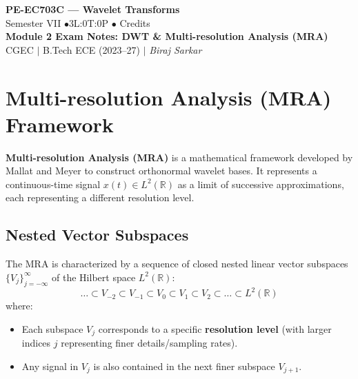\documentclass[12pt,a4paper]{article}
\begin{document}

\begin{center}
  {\LARGE\bfseries\color{myred} PE-EC703C --- Wavelet Transforms}\\[5pt]
  {\normalsize\color{mydark} Semester VII \quad$\bullet$\quad 3L:0T:0P \quad$\bullet$ Credits}\\[3pt]
  {\normalsize\color{myteal}\textbf{Module 2 Exam Notes: DWT \& Multi-resolution Analysis (MRA)}}\\[3pt]
  {\small\color{mydark} CGEC \;$|$\; B.Tech ECE (2023--27) \;$|$\; \textit{Biraj Sarkar}}
\end{center}
\vspace{2pt}
\noindent{\color{myred}\rule{\linewidth}{1.5pt}}
\vspace{2pt}

\hypersetup{linkcolor=mydark}
\tableofcontents
\hypersetup{linkcolor=myteal}
\newpage

\section{Multi-resolution Analysis (MRA) Framework}

\begin{tcolorbox}[defbox, title={\textbf{Definition of Multi-resolution Analysis}}]
\textbf{Multi-resolution Analysis (MRA)} is a mathematical framework developed by Mallat and Meyer to construct orthonormal wavelet bases. It represents a continuous-time signal $x(t) \in L^2(\mathbb{R})$ as a limit of successive approximations, each representing a different resolution level.
\end{tcolorbox}

\subsection{Nested Vector Subspaces}
The MRA is characterized by a sequence of closed nested linear vector subspaces $\{V_j\}_{j=-\infty}^{\infty}$ of the Hilbert space $L^2(\mathbb{R})$:
$$\dots \subset V_{-2} \subset V_{-1} \subset V_0 \subset V_1 \subset V_2 \subset \dots \subset L^2(\mathbb{R})$$
where:
\begin{itemize}[leftmargin=*, itemsep=3.5pt]
  \item Each subspace $V_j$ corresponds to a specific \textbf{resolution level} (with larger indices $j$ representing finer details/sampling rates).
  \item Any signal in $V_j$ is also contained in the next finer subspace $V_{j+1}$.
\end{itemize}
\end{document}
